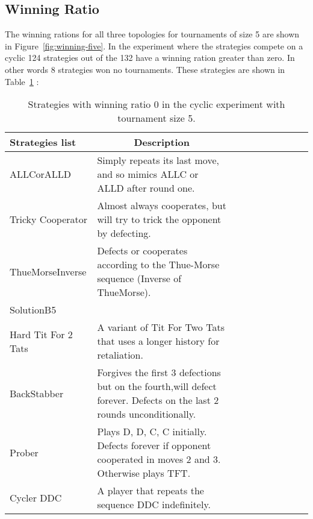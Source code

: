 \subsection{Winning Ratio}
\label{sub:winning-ratio}

The winning rations for all three topologies for tournaments of size 5
are shown in Figure~\ref{fig:winning-five}. In the experiment where the
strategies compete on a cyclic 124 strategies out of the 132 have a
winning ration greater than zero. In other words 8 strategies won no
tournaments. These strategies are shown in Table~\ref{winning-ratio-zero-cyclic-five} :

\begin{table}[h]
\centering
\begin{adjustbox}{width=1\textwidth}
\small
\begin{tabular}{@{}|l|l|l|l|l|l|l|l|l|l|@{}}
\toprule
\hline
Strategies list & \multicolumn{1}{c|}{Description}                                                                                                                    \\ \hline
ALLCorALLD          & Simply repeats its last move, and so mimics ALLC or ALLD after round one.                                                                           \\ \hline
Tricky Cooperator   & Almost always cooperates, but will try to trick the opponent by defecting.                                                                          \\ \hline
ThueMorseInverse    & Defects or cooperates according to the Thue-Morse sequence (Inverse of ThueMorse).                        \\ \hline
SolutionB5          &                                                                                                                                                     \\ \hline
Hard Tit For 2 Tats & A variant of Tit For Two Tats that uses a longer history for retaliation.                                \\ \hline
BackStabber         & Forgives the first 3 defections but on the fourth,will defect forever. Defects on the last 2 rounds unconditionally.                                \\ \hline
Prober              & Plays D, D, C, C initially. Defects forever if opponent cooperated in moves 2 and 3. Otherwise plays TFT. \\ \hline
Cycler DDC          & A player that repeats the sequence DDC indefinitely.                                                                                                \\ \hline
\end{tabular}
\end{adjustbox}
\caption{Strategies with winning ratio 0 in the cyclic experiment with tournament
         size 5.}
\label{winning-ratio-zero-cyclic-five}
\end{table}

